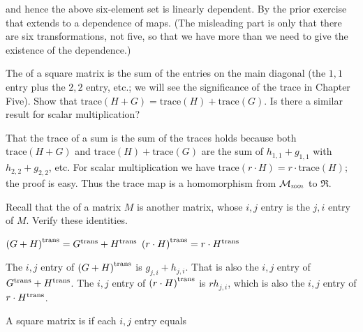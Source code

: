 \begin{exercises}
\begin{answer}
      and hence the above six-element set is linearly dependent.
      By the prior exercise that extends to a dependence of maps.
      (The misleading part is only that there are six transformations, not
      five, so that we have more than we need to give the existence of the 
      dependence.) 
    \end{answer}
  \item 
    The  
    of a square matrix is the sum of the entries on the main diagonal (the
    \( 1,1 \) entry
    plus the \( 2,2 \) entry, etc.;
    we will see the significance of the trace in Chapter Five).
    Show that \( \mbox{trace}(H+G)=\mbox{trace}(H)+\mbox{trace}(G)  \).
    Is there a similar result for scalar multiplication?
    \begin{answer}
      That the trace of a sum is the sum of the traces holds
      because both \( \text{trace}(H+G) \) and
      \( \text{trace}(H)+\text{trace}(G) \) are the sum of
      \( h_{1,1}+g_{1,1} \) with \( h_{2,2}+g_{2,2} \), etc.
      For scalar multiplication we have
      \( \mbox{trace}(r\cdot H)=r\cdot\mbox{trace}(H) \); the proof is easy.
      Thus the trace map is a homomorphism from $\mathcal{M}_{n \! \times \! n}$ to
      $\Re$.  
    \end{answer}
  \item 
    Recall that the %
    of a matrix $M$ is another matrix, whose $i,j$ entry is the 
    $j,i$ entry of $M$.
    Verify these identities.
    \begin{exparts}
      \partsitem \( {{(G+H)}^{\rm trans}}={{G}^{\rm trans}}+{{H}^{\rm trans}} \)
      \partsitem \( {{(r\cdot H)}^{\rm trans}}=r\cdot{{H}^{\rm trans}} \)
    \end{exparts}
    \begin{answer} 
      \begin{exparts}
        \partsitem The \( i,j \) entry of \( {{(G+H)}^{\rm trans}} \) is
          \( g_{j,i}+h_{j,i} \).
          That is also the \( i,j \) entry of \( {{G}^{\rm trans}}+{{H}^{\rm trans}} \).
        \partsitem The \( i,j \) entry of \( {{(r\cdot H)}^{\rm trans}} \) is
          \( rh_{j,i} \),
          which is also the \( i,j \) entry of \( r\cdot{{H}^{\rm trans}} \).
      \end{exparts}  
   \end{answer}
  \recommended \item 
    A square matrix is %
     if each \( i,j \) entry equals

\end{exercises}
